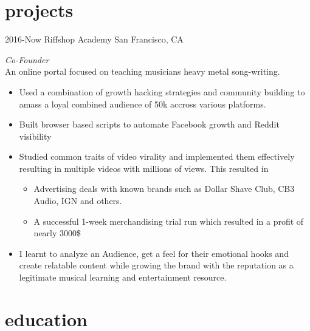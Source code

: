 \documentclass[print]{friggeri-cv} %
\begin{document}

\section{projects}
\begin{entrylist}


\entry
{2016-Now}
{Riffshop Academy}
{San Francisco, CA}
{ \emph{Co-Founder} \\
An online portal focused on teaching musicians heavy metal song-writing.
\begin{itemize}
\item Used a combination of growth hacking strategies and community building to amass a loyal combined audience of 50k accross various platforms.
\item Built browser based scripts to automate Facebook growth and Reddit visibility
\item Studied common traits of video virality and implemented them effectively
resulting in multiple videos with millions of views. This resulted in
\begin{itemize}
\item Advertising deals with known brands such as Dollar Shave Club, CB3 Audio, IGN and others.
\item A successful 1-week merchandising trial run which resulted in a profit of nearly 3000\$
\end{itemize}
\item I learnt to analyze an Audience, get a feel for their emotional hooks and
create relatable content while growing the brand with the reputation as a legitimate musical learning and entertainment resource.
\end{itemize}}


\end{entrylist}


\section{education}
\end{document}
